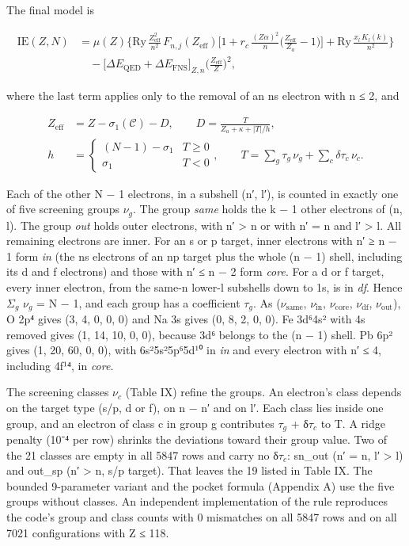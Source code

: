 \documentclass[aps,pra,preprint,notitlepage,superscriptaddress,amsmath,amssymb]{revtex4-2}
\begin{document}
The final model is


\begin{equation}
\begin{aligned}
\mathrm{IE}(Z,N)&=\mu(Z)\Big\{\mathrm{Ry}\,\frac{Z_\mathrm{eff}^2}{n^2}\,F_{n,j}(Z_\mathrm{eff})\Big[1+r_c\,\frac{(Z\alpha)^2}{n}\Big(\frac{Z_\mathrm{eff}}{Z_a}-1\Big)\Big]+\mathrm{Ry}\,\frac{x_l\,K_l(k)}{n^2}\Big\}\\
&\quad-\big[\Delta E_\mathrm{QED}+\Delta E_\mathrm{FNS}\big]_{Z,n}\Big(\frac{Z_\mathrm{eff}}{Z}\Big)^2,
\end{aligned}
\end{equation}

where the last term applies only to the removal of an ns electron with n ≤ 2, and


\begin{equation}
\begin{aligned}
Z_\mathrm{eff}&=Z-\sigma_1(\mathcal C)-D,\qquad
D=\frac{T}{Z_a+\kappa+|T|/h},\\
h&=\begin{cases}(N-1)-\sigma_1 & T\ge 0\\ \sigma_1 & T<0\end{cases},\qquad
T=\sum_{g}\tau_g\,\nu_g+\sum_{c}\delta\tau_c\,\nu_c .\end{aligned}
\end{equation}

Each of the other N − 1 electrons, in a subshell (n′, l′), is counted in exactly one of five screening groups $ν_{g}$. The group \emph{same} holds the k − 1 other electrons of (n, l). The group \emph{out} holds outer electrons, with n′ > n or with n′ = n and l′ > l. All remaining electrons are inner. For an s or p target, inner electrons with n′ ≥ n − 1 form \emph{in} (the ns electrons of an np target plus the whole (n − 1) shell, including its d and f electrons) and those with n′ ≤ n − 2 form \emph{core}. For a d or f target, every inner electron, from the same-n lower-l subshells down to 1s, is in \emph{df}. Hence $Σ_{g}$ $ν_{g}$ = N − 1, and each group has a coefficient $τ_{g}$. As ($ν_{\mathrm{same}}$, $ν_{\mathrm{in}}$, $ν_{\mathrm{core}}$, $ν_{\mathrm{df}}$, $ν_{\mathrm{out}}$), O 2p⁴ gives (3, 4, 0, 0, 0) and Na 3s gives (0, 8, 2, 0, 0). Fe 3d⁶4s² with 4s removed gives (1, 14, 10, 0, 0), because 3d⁶ belongs to the (n − 1) shell. Pb 6p² gives (1, 20, 60, 0, 0), with 6s²5s²5p⁶5d¹⁰ in \emph{in} and every electron with n′ ≤ 4, including 4f¹⁴, in \emph{core}.


The screening classes $ν_{c}$ (Table IX) refine the groups. An electron's class depends on the target type (s/p, d or f), on n − n′ and on l′. Each class lies inside one group, and an electron of class c in group g contributes $τ_{g}$ + δ$τ_{c}$ to T. A ridge penalty (10⁻⁴ per row) shrinks the deviations toward their group value. Two of the 21 classes are empty in all 5847 rows and carry no δ$τ_{c}$: sn\_out (n′ = n, l′ > l) and out\_sp (n′ > n, s/p target). That leaves the 19 listed in Table IX. The bounded 9-parameter variant and the pocket formula (Appendix A) use the five groups without classes. An independent implementation of the rule reproduces the code's group and class counts with 0 mismatches on all 5847 rows and on all 7021 configurations with Z ≤ 118.
\end{document}
